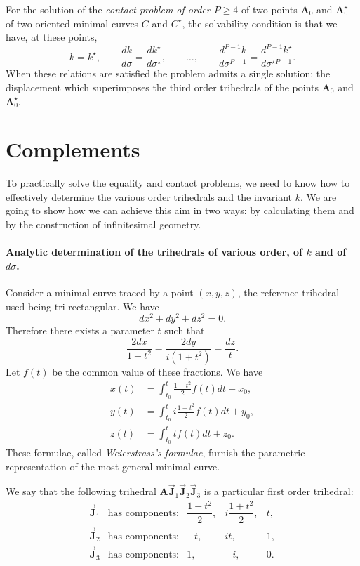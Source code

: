 \documentclass[leqno,11pt]{book}
\numberwithin{equation}{chapter}
\theoremstyle{shape1}
\theoremstyle{shapesmall}
\newcommand{\str}{^{\star}}
\newcommand{\rvec}[1]{\vec{\mathbf{#1}}}
\newcommand{\jvec}{\rvec{J}}
\newcommand{\somespace}{\vspace{9pt}}
\begin{document}
\somespace

For the solution of the \emph{contact problem of order $P\ge 4$} of two points $\mathbf{A}_{0}$ and $\mathbf{A}_{0}\str$ of two oriented minimal curves $C$ and $C\str$, the solvability condition is that we have, at these points,
\[
k=k\str,\qquad \frac{dk}{d\sigma}=\frac{dk\str}{d\sigma\str},\qquad\dots,\qquad\frac{d^{P-1}k}{d\sigma^{P-1}}=\frac{d^{P-1}k\str}{d\sigma^{\star P-1}}.
\]
When these relations are satisfied the problem admits a single solution: the displacement which superimposes the third order trihedrals of the points $\mathbf{A}_{0}$ and $\mathbf{A}\str_{0}$.


\section{Complements}
\label{sec:complements}

To practically solve the equality and contact problems, we need to know how to effectively determine the various order trihedrals and the invariant $k$. We are going to show how we can achieve this aim in two ways: by calculating them and by the construction of infinitesimal geometry.

\paragraph{Analytic determination of the trihedrals of various order, of $k$ and of $d\sigma$.}
\label{sec:36}
Consider a minimal curve traced by a point $(x,y,z)$, the reference trihedral used being tri-rectangular. We have
\[
dx^{2}+dy^{2}+dz^{2}=0.
\]
Therefore there exists a parameter $t$ such that
\[
\frac{2dx}{1-t^{2}}=\frac{2dy}{i(1+t^{2})}=\frac{dz}{t}.
\]
Let $f(t)$ be the common value of these fractions. We have
\label{x:weierstrass}
\begin{align*}
  x(t)&=\int_{t_{0}}^{t}\frac{1-t^{2}}{2}f(t)dt+x_{0},\\
  y(t)&=\int_{t_{0}}^{t}i\frac{1+t^{2}}{2}f(t)dt+y_{0},\\
  z(t)&=\int_{t_{0}}^{t}tf(t)dt+z_{0}.
\end{align*}
These formulae, called \emph{Weierstrass's formulae}, furnish the parametric representation of the most general minimal curve.

We say that the following trihedral $\mathbf{A}\jvec_{1}\jvec_{2}\jvec_{3}$ is a particular first order trihedral:
\[
\begin{matrix}
  \jvec_{1}&\text{has components:}&\dfrac{1-t^{2}}{2},&i\dfrac{1+t^{2}}{2},&t,\\
  \jvec_{2}&\text{has components:}&-t,&it,&1,\\
  \jvec_{3}&\text{has components:}&1,&-i,&0.
\end{matrix}
\]
\end{document}
